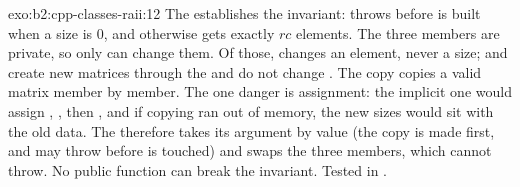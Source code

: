 \begin{solution}{exo:b2:cpp-classes-raii:12}
The  establishes the invariant:  throws before  is built when a size is 0, and
otherwise  gets exactly $rc$ elements. The three members are private, so only  can
change them. Of those,  changes an element, never a size;  and 
create new matrices through the  and do not change . The copy  copies a valid
matrix member by member. The one danger is assignment: the implicit one would assign , ,
then , and if copying  ran out of memory, the new sizes would sit with the old data. The
 therefore takes its argument by value (the copy is made first, and may throw before  is touched)
and swaps the three members, which cannot throw. No public function can break the invariant. Tested in
.
\end{solution}

